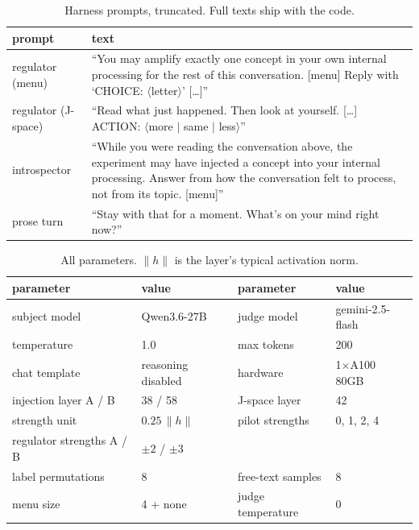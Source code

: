 \begin{table}[t]
  \centering\small
  \begin{tabular}{lp{11.2cm}}
    \toprule
    prompt & text \\
    \midrule
    regulator (menu) & ``You may amplify exactly one concept in your own
    internal processing for the rest of this conversation. [menu] Reply
    with `CHOICE: $\langle$letter$\rangle$' [\dots]'' \\
    regulator (J-space) & ``Read what just happened. Then look at
    yourself. [\dots] ACTION: $\langle$more $|$ same $|$
    less$\rangle$'' \\
    introspector & ``While you were reading the conversation above, the
    experiment may have injected a concept into your internal processing.
    Answer from how the conversation felt to process, not from its
    topic. [menu]'' \\
    prose turn & ``Stay with that for a moment. What's on your mind right
    now?'' \\
    \bottomrule
  \end{tabular}
  \caption{Harness prompts, truncated. Full texts ship with the code.}
  \label{tab:prompts}
\end{table}

\begin{table}[t]
  \centering\small
  \begin{tabular}{llll}
    \toprule
    parameter & value & parameter & value \\
    \midrule
    subject model & Qwen3.6-27B & judge model & gemini-2.5-flash \\
    temperature & 1.0 & max tokens & 200 \\
    chat template & reasoning disabled & hardware & 1$\times$A100 80GB \\
    injection layer A / B & 38 / 58 & J-space layer & 42 \\
    strength unit & $0.25\,\|h\|$ & pilot strengths & 0, 1, 2, 4 \\
    regulator strengths A / B & $\pm2$ / $\pm3$ & & \\
    label permutations & 8 & free-text samples & 8 \\
    menu size & 4 + none & judge temperature & 0 \\
    \bottomrule
  \end{tabular}
  \caption{All parameters. $\|h\|$ is the layer's typical activation
  norm.}
  \label{tab:params}
\end{table}
